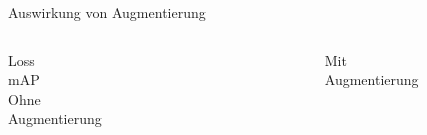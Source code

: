 \begin{frame}{Auswirkung von Augmentierung}

    \begin{columns}[T]
        \vspace{1.5cm}
        Loss\\
        \vspace{3cm}
        mAP\\
        

        \centering
        Ohne Augmentierung
        \begin{figure}
            \centering
            \def\svgwidth{0.75\columnwidth}
            \footnotesize
            
        \end{figure}

        \begin{figure}
            \centering
            \def\svgwidth{0.75\columnwidth}
            \footnotesize
            
        \end{figure}
        

        \centering
        Mit Augmentierung

        \begin{figure}
            \centering
            \def\svgwidth{0.75\columnwidth}
            \footnotesize
            
        \end{figure}
        \begin{figure}
            \centering
            \def\svgwidth{0.75\columnwidth}
            \footnotesize
            
        \end{figure}
        
    \end{columns}
\end{frame}



